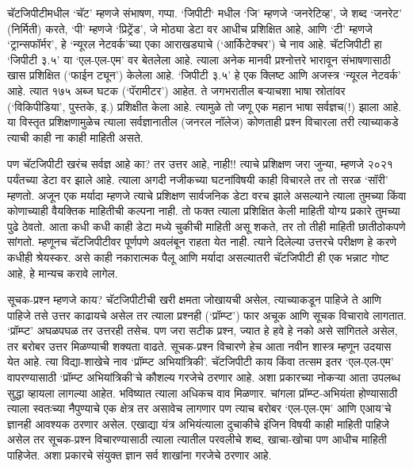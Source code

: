 चॅटजिपीटीमधील `चॅट' म्हणजे संभाषण, गप्पा. `जिपीटी` मधील `जि' म्हणजे `जनरेटिव्ह', जे शब्द `जनरेट' (निर्मिती) करते, `पी' म्हणजे `प्रिट्रेंड', जे मोठ्या डेटा वर आधीच प्रशिक्षित आहे, आणि `टी' म्हणजे `ट्रान्सफॉर्मर', हे `न्यूरल नेटवर्क'च्या एका आराखड्याचे (`आर्किटेक्चर') चे नाव आहे. चॅटजिपीटी हा `जिपीटी ३.५' या `एल-एल-एम' वर बेतलेला आहे. त्याला अनेक मानवी प्रश्नोत्तरे भारावून संभाषणासाठी खास प्रशिक्षित (`फाईन ट्यून') केलेला आहे. `जिपीटी ३.५' हे एक क्लिष्ट आणि अजस्त्र `न्यूरल नेटवर्क' आहे. त्यात १७५ अब्ज घटक (`पॅरामीटर') आहेत. ते जगभरातील बऱ्याचशा भाषा स्रोतांवर (`विकिपीडिया', पुस्तके, इ.) प्रशिक्षीत केला आहे. त्यामुळे तो जणू एक महान भाषा सर्वज्ञच(!) झाला आहे. या विस्तृत प्रशिक्षणामुळेच त्याला सर्वज्ञानातील (जनरल नॉलेज) कोणताही प्रश्न विचारला तरी त्याच्याकडे त्याची काही ना काही माहिती असते.

पण चॅटजिपीटी खरंच सर्वज्ञ आहे का? तर उत्तर आहे, नाही!! त्याचे प्रशिक्षण जरा जुन्या, म्हणजे २०२१ पर्यंतच्या डेटा वर झाले आहे. त्याला अगदी नजीकच्या घटनांविषयी काही विचारले तर तो सरळ `सॉरी' म्हणतो. अजून एक मर्यादा म्हणजे त्याचे प्रशिक्षण सार्वजनिक डेटा वरच झाले असल्याने त्याला तुमच्या किंवा कोणाच्याही वैयक्तिक माहितीची कल्पना नाही. तो फक्त त्याला प्रशिक्षित केली माहिती योग्य प्रकारे तुमच्या पुढे ठेवतो. आता कधी कधी काही डेटा मध्ये चुकीची माहिती असू शकते, तर तो तीही माहिती छातीठोकपणे सांगतो. म्हणूनच चॅटजिपीटीवर पूर्णपणे अवलंबून राहता येत नाही. त्याने दिलेल्या उत्तरचे परीक्षण हे करणे कधीही श्रेयस्कर. असे काही नकारात्मक पैलू आणि मर्यादा असल्यातरी चॅटजिपीटी ही एक भन्नाट गोष्ट आहे, हे मान्यच करावे लागेल.

सूचक-प्रश्न म्हणजे काय?
चॅटजिपीटीची खरी क्षमता जोखायची असेल, त्याच्याकडून पाहिजे ते आणि पाहिजे तसे उत्तर काढायचे असेल तर त्याला प्रश्नही (`प्रॉम्प्ट') फार अचूक आणि सूचक विचारावे लागतात. `प्रॉम्प्ट' अघळपघळ तर उत्तरही तसेच. पण जरा सटीक प्रश्न, ज्यात हे हवे हे नको असे सांगितले असेल, तर बरोबर उत्तर मिळण्याची शक्यता वाढते. सूचक-प्रश्न विचारणे हेच आता नवीन शास्त्र म्हणून उदयास येत आहे. त्या विद्या-शाखेचे नाव `प्रॉम्प्ट अभियांत्रिकी'. चॅटजिपीटी काय किंवा तत्सम इतर `एल-एल-एम' वापरण्यासाठी `प्रॉम्प्ट अभियांत्रिकी'चे कौशल्य गरजेचे ठरणार आहे. अशा प्रकारच्या नोकऱ्या आता उपलब्ध सुद्धा व्हायला लागल्या आहेत. भविष्यात त्याला अधिकच वाव मिळणार. चांगला प्रॉम्प्ट-अभियंता होण्यासाठी त्याला स्वतःच्या नैपुण्याचे एक क्षेत्र तर असावेच लागणार पण त्याच बरोबर `एल-एल-एम' आणि एआय'चे ज्ञानही आवश्यक ठरणार असेल. एखाद्या यंत्र अभियंत्याला दुचाकीचे इंजिन विषयी काही माहिती पाहिजे असेल तर सूचक-प्रश्न विचारण्यासाठी त्याला त्यातील परवलीचे शब्द, खाचा-खोचा पण आधीच माहिती पाहिजेत. अशा प्रकारचे संयुक्त ज्ञान सर्व शाखांना गरजेचे ठरणार आहे.

